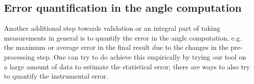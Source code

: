 %
%




\subsection{Error quantification in the angle computation}

Another additional step towards validation or an integral part of taking measurements in general %
is to quantify the error in the angle computation, e.g. the maximum or average error in the final result due to the changes in the pre-processing step. %
One can try to do achieve this empirically by trying our tool on a large amount of data to estimate the statistical error; there are ways to also try to quantify the instrumental error. 


%


